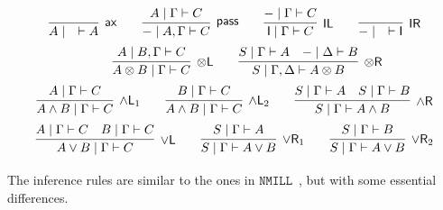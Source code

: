 \documentclass[submission,copyright,creativecommons]{eptcs}
\theoremstyle{definition}
\newcommand{\tl}{\otimes \mathsf{L}}
\newcommand{\tr}{\otimes \mathsf{R}}
\newcommand{\pass}{\mathsf{pass}}
\newcommand{\unitl}{\mathsf{IL}}
\newcommand{\unitr}{\mathsf{IR}}
\newcommand{\andlone}{\land \mathsf{L}_{1}}
\newcommand{\andltwo}{\land \mathsf{L}_{2}}
\newcommand{\andr}{\land \mathsf{R}}
\newcommand{\orl}{\lor \mathsf{L}}
\newcommand{\orrone}{\lor \mathsf{R}_{1}}
\newcommand{\orrtwo}{\lor \mathsf{R}_{2}}
\newcommand{\ax}{\mathsf{ax}}
\newcommand{\ot}{\otimes}
\newcommand{\I}{\mathsf{I}}
\newcommand{\NMILL}{$\mathtt{NMILL}$}
\begin{document}
\begin{equation}\label{eq:seqcalc}
  \def\arraystretch{2.5}
  \begin{array}{c}
    \infer[\ax]{A \mid \quad \vdash A}{}
    \qquad
    \infer[\pass]{{-} \mid A , \Gamma \vdash C}{A \mid \Gamma \vdash C}
    \qquad
    \infer[\unitl]{\I \mid \Gamma \vdash C}{{-} \mid \Gamma \vdash C}
    \qquad
    \infer[\unitr]{{-} \mid \quad \vdash \I}{}
    \\
    \qquad
    \infer[\tl]{A \ot B \mid \Gamma \vdash C}{A \mid B , \Gamma \vdash C}
    \qquad
    \infer[\tr]{S \mid \Gamma , \Delta \vdash A \ot B}{
      S \mid \Gamma \vdash A
      &
      {-} \mid \Delta \vdash B
    }
    \\
    \infer[\andlone]{A \land B \mid \Gamma \vdash C}{A \mid \Gamma \vdash C}
    \qquad
    \infer[\andltwo]{A \land B \mid \Gamma \vdash C}{B \mid \Gamma \vdash C}
    \qquad
    \infer[\andr]{S \mid \Gamma \vdash A \land B}{
      S \mid \Gamma \vdash A
      &
      S \mid \Gamma \vdash B
    }
    \\
    \infer[\orl]{A \lor B \mid \Gamma \vdash C}{
      A \mid \Gamma \vdash C
      &
      B \mid \Gamma \vdash C
    }
    \qquad
    \infer[\orrone]{S \mid \Gamma \vdash A \lor B}{S \mid \Gamma \vdash A}
    \qquad
    \infer[\orrtwo]{S \mid \Gamma \vdash A \lor B}{S \mid \Gamma \vdash B}
  \end{array}
\end{equation}
The inference rules are similar to the ones in \NMILL \ \cite{abrusci:noncommutative:1990}, but with some essential differences. 
\end{document}
